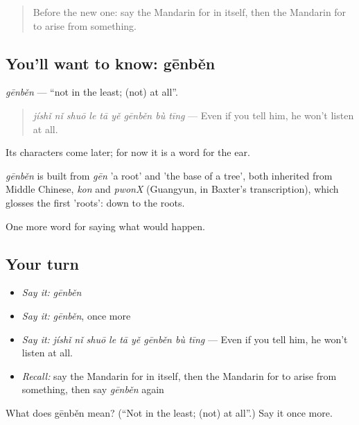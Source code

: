 \label{lesson:ZH-C538-genben}



\begin{quote}
Before the new one: say the Mandarin for in itself, then the Mandarin for to arise from something.
\end{quote}

\subsection*{You'll want to know: gēnběn}
\emph{gēnběn} — \textquotedblleft{}not in the least; (not) at all\textquotedblright{}.

\begin{quote}
\emph{jíshǐ nǐ shuō le tā yě gēnběn bù tīng} — Even if you tell him, he won't listen at all.
\end{quote}

Its characters come later; for now it is a word for the ear.

\begin{cousinweb}
\emph{gēnběn} is built from \emph{gēn} 'a root' and  'the base of a tree', both inherited from Middle Chinese, \emph{kon} and \emph{pwonX} (Guangyun, in Baxter's transcription), which glosses the first 'roots': down to the roots.
\end{cousinweb}

\begin{grammarlens}[title={What you've built}]
One more word for saying what would happen.
\end{grammarlens}

\subsection*{Your turn}
\begin{itemize}
\raggedright
  \item \emph{Say it:} \emph{gēnběn}
  \item \emph{Say it:} \emph{gēnběn}, once more
  \item \emph{Say it:} \emph{jíshǐ nǐ shuō le tā yě gēnběn bù tīng} — Even if you tell him, he won't listen at all.
  \item \emph{Recall:} say the Mandarin for in itself, then the Mandarin for to arise from something, then say \emph{gēnběn} again
\end{itemize}

\begin{tcolorbox}[breakable,colback=teal!4,colframe=teal!35!black,title={Before you move on}]
What does gēnběn mean? (\textquotedblleft{}Not in the least; (not) at all\textquotedblright{}.) Say it once more.
\end{tcolorbox}
